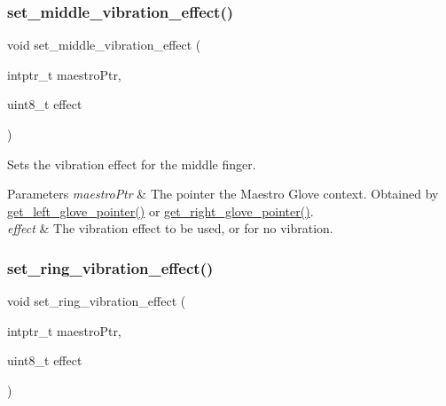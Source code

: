 \subsubsection{\texorpdfstring{set\+\_\+middle\+\_\+vibration\+\_\+effect()}{set\_middle\_vibration\_effect()}}
{\footnotesize\ttfamily void set\+\_\+middle\+\_\+vibration\+\_\+effect (\begin{DoxyParamCaption}\item[{intptr\+\_\+t}]{maestro\+Ptr,  }\item[{uint8\+\_\+t}]{effect }\end{DoxyParamCaption})}

Sets the vibration effect for the middle finger. 
\begin{DoxyParams}{Parameters}
{\em maestro\+Ptr} & The pointer the Maestro Glove context. Obtained by \hyperlink{group__glove_management_ga63ce3c99d4a8b8db851b22af9185764e}{get\+\_\+left\+\_\+glove\+\_\+pointer()} or \hyperlink{group__glove_management_ga9b8fd9d91aeac3f8da50f7a7eba0c32b}{get\+\_\+right\+\_\+glove\+\_\+pointer()}. \\
\hline
{\em effect} & The vibration effect to be used, or {} for no vibration. \\
\hline
\end{DoxyParams}
\mbox{\label{group__vibration_control_ga8fbe7c8a6e2d9566023c31d0da891d74}} 
\subsubsection{\texorpdfstring{set\+\_\+ring\+\_\+vibration\+\_\+effect()}{set\_ring\_vibration\_effect()}}
{\footnotesize\ttfamily void set\+\_\+ring\+\_\+vibration\+\_\+effect (\begin{DoxyParamCaption}\item[{intptr\+\_\+t}]{maestro\+Ptr,  }\item[{uint8\+\_\+t}]{effect }\end{DoxyParamCaption})}

